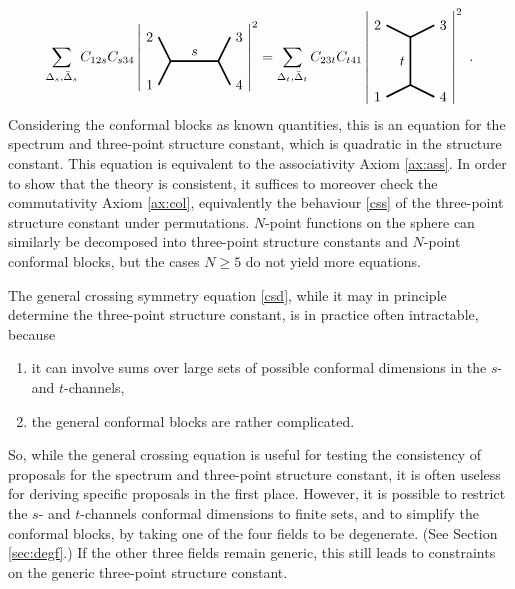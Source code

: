 \documentclass[12pt, a4paper, notitlepage, twoside]{report}
\numberwithin{equation}{section}
\theoremstyle{break}
\begin{document}
\begin{align}
 \sum_{\Delta_s,\bar{\Delta}_s} C_{12s} C_{s34} \left| 
 \begin{tikzpicture}[baseline=(current  bounding  box.center), very thick, scale = .3]
\draw (-1,2) node [left] {$2$} -- (0,0) -- node [above] {$s$} (4,0) -- (5,2) node [right] {$3$};
\draw (-1,-2) node [left] {$1$} -- (0,0);
\draw (4,0) -- (5,-2) node [right] {$4$};
\end{tikzpicture} 
\right|^2 = \sum_{\Delta_t,\bar{\Delta}_t} C_{23t}C_{t41} \left|
\begin{tikzpicture}[baseline=(current  bounding  box.center), very thick, scale = .3]
 \draw (-2,3) node [left] {$2$} -- (0,2) -- node [left] {$t$} (0,-2) -- (-2, -3) node [left] {$1$};
\draw (0,2) -- (2,3) node [right] {$3$};
\draw (0,-2) -- (2, -3) node [right] {$4$};
\end{tikzpicture}
\right|^2\ .
\label{csd}
\end{align}
Considering the conformal blocks as known quantities, this is an equation for the spectrum and three-point structure constant, which is quadratic in the structure constant.
This equation is equivalent to the associativity Axiom \ref{ax:ass}. In order to show that the theory is consistent, it suffices to moreover check the commutativity Axiom \ref{ax:col}, equivalently the behaviour \eqref{css} of the three-point structure constant under permutations. 
$N$-point functions on the sphere can similarly be decomposed into three-point structure constants and $N$-point conformal blocks, but the cases $N\geq 5$ do not yield more equations. 

The general crossing symmetry equation \eqref{csd}, while it may in principle determine the three-point structure constant, is in practice often intractable, because
\begin{enumerate}
 \item it can involve sums over large sets of possible conformal dimensions in the $s$- and $t$-channels, 
 \item the general conformal blocks are rather complicated. 
\end{enumerate}
So, while the general crossing equation is useful for testing the consistency of proposals for the spectrum and three-point structure constant, it is often useless for deriving specific proposals in the first place. However, it is possible to restrict the $s$- and $t$-channels conformal dimensions to finite sets, and to simplify the conformal blocks, by taking one of the four fields to be degenerate. (See Section \ref{sec:degf}.) If the other three fields remain generic, this still leads to constraints on the generic three-point structure constant. 
\end{document}
